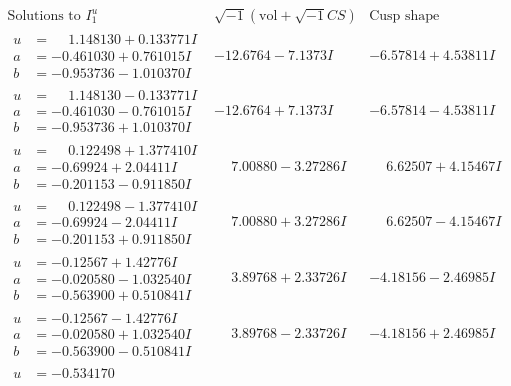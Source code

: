 \documentclass[1p]{elsarticle_modified}
\theoremstyle{definition}
\newcommand{\I}{\sqrt{-1}}
\begin{document}
$$\begin{array}{c|c|c}  
\text{Solutions to }I^u_{1}& \I (\text{vol} + \sqrt{-1}CS) & \text{Cusp shape}\\
 \hline 
\begin{aligned}
u &= \phantom{-}1.148130 + 0.133771 I \\
a &= -0.461030 + 0.761015 I \\
b &= -0.953736 - 1.010370 I\end{aligned}
 & -12.6764 - 7.1373 I & -6.57814 + 4.53811 I \\ \hline\begin{aligned}
u &= \phantom{-}1.148130 - 0.133771 I \\
a &= -0.461030 - 0.761015 I \\
b &= -0.953736 + 1.010370 I\end{aligned}
 & -12.6764 + 7.1373 I & -6.57814 - 4.53811 I \\ \hline\begin{aligned}
u &= \phantom{-}0.122498 + 1.377410 I \\
a &= -0.69924 + 2.04411 I \\
b &= -0.201153 - 0.911850 I\end{aligned}
 & \phantom{-}7.00880 - 3.27286 I & \phantom{-}6.62507 + 4.15467 I \\ \hline\begin{aligned}
u &= \phantom{-}0.122498 - 1.377410 I \\
a &= -0.69924 - 2.04411 I \\
b &= -0.201153 + 0.911850 I\end{aligned}
 & \phantom{-}7.00880 + 3.27286 I & \phantom{-}6.62507 - 4.15467 I \\ \hline\begin{aligned}
u &= -0.12567 + 1.42776 I \\
a &= -0.020580 - 1.032540 I \\
b &= -0.563900 + 0.510841 I\end{aligned}
 & \phantom{-}3.89768 + 2.33726 I & -4.18156 - 2.46985 I \\ \hline\begin{aligned}
u &= -0.12567 - 1.42776 I \\
a &= -0.020580 + 1.032540 I \\
b &= -0.563900 - 0.510841 I\end{aligned}
 & \phantom{-}3.89768 - 2.33726 I & -4.18156 + 2.46985 I \\ \hline\begin{aligned}
u &= -0.534170\phantom{ +0.000000I} \\

\end{aligned}
\end{array}$$
\end{document}
